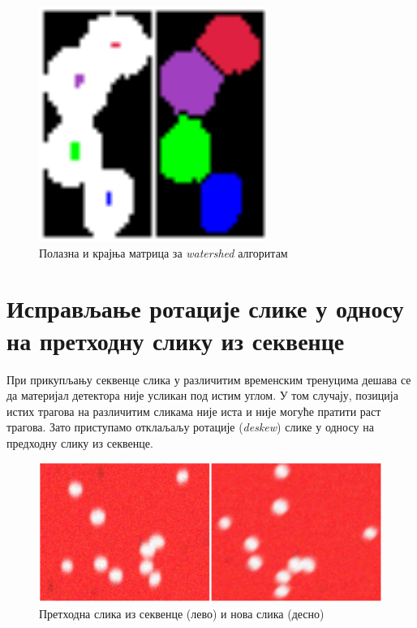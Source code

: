 \documentclass[11pt,a4paper,serbian,oneside]{book}
\begin{document}
\begin{figure}[htb]
\begin{center}
\includegraphics[width=75mm]{images/watershed.png}
\end{center}
\caption{Полазна и крајња матрица за \textit{watershed} алгоритам}
\label{fig:result}
\end{figure}

\section{Исправљање ротације слике у односу на претходну слику из секвенце}

При прикупљању секвенце слика у различитим временским тренуцима дешава се да материјал детектора није усликан под истим углом. У том случају, позиција истих трагова на различитим сликама није иста и није могуће пратити раст трагова. Зато приступамо отклаљаљу ротације (\textit{deskew}) слике у односу на предходну слику из секвенце.

\begin{figure}
\begin{center}
\includegraphics[width=150mm]{images/prev+new.png}
\end{center}
\caption{Претходна слика из секвенце (лево) и нова слика (десно)}
\label{fig:otsu}
\end{figure}
\end{document}
